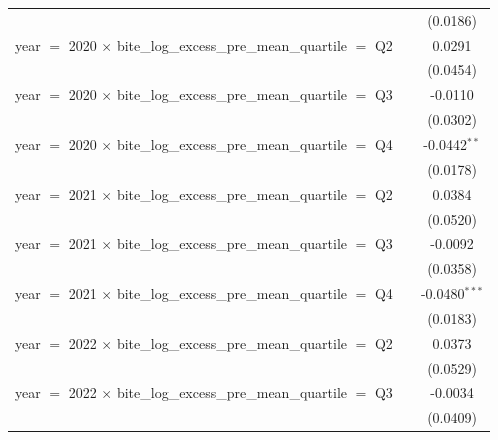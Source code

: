 \begin{tabular}{lcc}
                                                                              &                          & (0.0186)\\   
   year $=$ 2020 $\times$ bite\_log\_excess\_pre\_mean\_quartile $=$ Q2       &                          & 0.0291\\   
                                                                              &                          & (0.0454)\\   
   year $=$ 2020 $\times$ bite\_log\_excess\_pre\_mean\_quartile $=$ Q3       &                          & -0.0110\\   
                                                                              &                          & (0.0302)\\   
   year $=$ 2020 $\times$ bite\_log\_excess\_pre\_mean\_quartile $=$ Q4       &                          & -0.0442$^{**}$\\   
                                                                              &                          & (0.0178)\\   
   year $=$ 2021 $\times$ bite\_log\_excess\_pre\_mean\_quartile $=$ Q2       &                          & 0.0384\\   
                                                                              &                          & (0.0520)\\   
   year $=$ 2021 $\times$ bite\_log\_excess\_pre\_mean\_quartile $=$ Q3       &                          & -0.0092\\   
                                                                              &                          & (0.0358)\\   
   year $=$ 2021 $\times$ bite\_log\_excess\_pre\_mean\_quartile $=$ Q4       &                          & -0.0480$^{***}$\\   
                                                                              &                          & (0.0183)\\   
   year $=$ 2022 $\times$ bite\_log\_excess\_pre\_mean\_quartile $=$ Q2       &                          & 0.0373\\   
                                                                              &                          & (0.0529)\\   
   year $=$ 2022 $\times$ bite\_log\_excess\_pre\_mean\_quartile $=$ Q3       &                          & -0.0034\\   
                                                                              &                          & (0.0409)\\   

\end{tabular}
